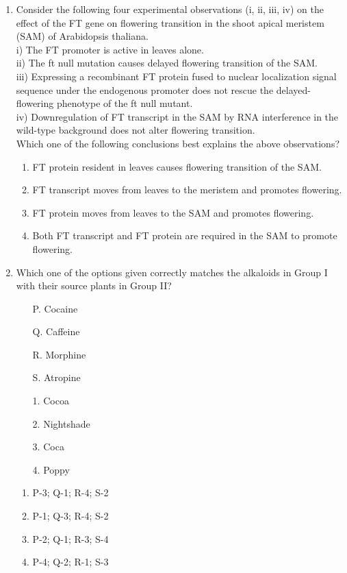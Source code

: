 \documentclass[journal,12pt,onecolumn]{IEEEtran}
\begin{document}
\begin{enumerate}
    \item Consider the following four experimental observations (i, ii, iii, iv) on the effect of the FT gene on flowering transition in the shoot apical meristem (SAM) of Arabidopsis thaliana.\\
    i) The FT promoter is active in leaves alone.\\
    ii) The ft null mutation causes delayed flowering transition of the SAM.\\
    iii) Expressing a recombinant FT protein fused to nuclear localization signal sequence under the endogenous promoter does not rescue the delayed-flowering phenotype of the ft null mutant.\\
    iv) Downregulation of FT transcript in the SAM by RNA interference in the wild-type background does not alter flowering transition.\\
    Which one of the following conclusions best explains the above observations?
    \begin{enumerate}
        \item FT protein resident in leaves causes flowering transition of the SAM.
        \item FT transcript moves from leaves to the meristem and promotes flowering.
        \item FT protein moves from leaves to the SAM and promotes flowering.
        \item Both FT transcript and FT protein are required in the SAM to promote flowering.
    \end{enumerate}

    \item \begin{minipage}{0.45\textwidth}
    Which one of the options given correctly matches the alkaloids in Group I with their source plants in Group II?
    \begin{itemize}
        \item[P.] Cocaine
        \item[Q.] Caffeine
        \item[R.] Morphine
        \item[S.] Atropine
    \end{itemize}
    \end{minipage}
    \begin{minipage}{0.45\textwidth}
    \begin{itemize}
        \item[1.] Cocoa
        \item[2.] Nightshade
        \item[3.] Coca
        \item[4.] Poppy
    \end{itemize}
    \end{minipage}
    \begin{enumerate}
        \item P-3; Q-1; R-4; S-2
        \item P-1; Q-3; R-4; S-2
        \item P-2; Q-1; R-3; S-4
        \item P-4; Q-2; R-1; S-3
    \end{enumerate}


\end{enumerate}
\end{document}

